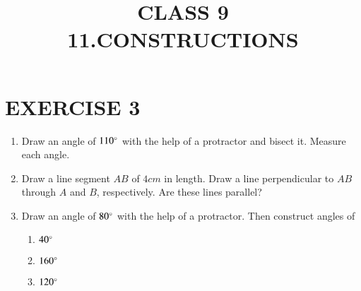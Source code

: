 \documentclass{article}
\begin{document}
\title{CLASS 9\\11.CONSTRUCTIONS}
\date{}
\maketitle
\section{EXERCISE 3}
\begin{enumerate}
\item Draw an angle of $110\degree$ with the help of a protractor and bisect it. Measure each angle.
\item Draw a line segment $AB$ of $4 cm$ in length. Draw a line perpendicular to $AB$ through $A$ and $B$, respectively. Are these lines parallel?
\item Draw an angle of $80\degree$ with the help of a protractor. Then construct angles of
\begin{enumerate}
\item $40\degree$
\item $160\degree$
\item $120\degree$
\end{enumerate}
\end{enumerate}
\end{document}
